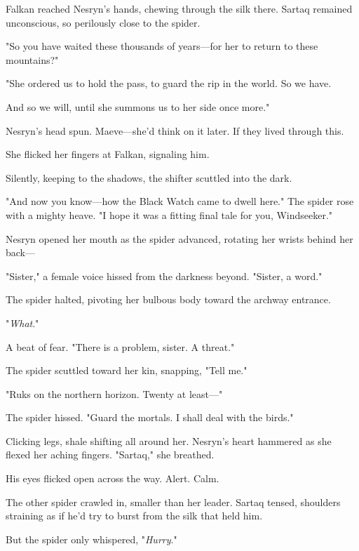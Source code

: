 Falkan reached Nesryn's hands, chewing through the silk there. Sartaq remained unconscious, so perilously close to the spider.

"So you have waited these thousands of years---for her to return to these mountains?"

"She ordered us to hold the pass, to guard the rip in the world. So we have.

And so we will, until she summons us to her side once more."

Nesryn's head spun. Maeve---she'd think on it later. If they lived through this.

She flicked her fingers at Falkan, signaling him.

Silently, keeping to the shadows, the shifter scuttled into the dark.

"And now you know---how the Black Watch came to dwell here." The spider rose with a mighty heave. "I hope it was a fitting final tale for you, Windseeker."

Nesryn opened her mouth as the spider advanced, rotating her wrists behind her back---

"Sister," a female voice hissed from the darkness beyond. "Sister, a word."

The spider halted, pivoting her bulbous body toward the archway entrance.

"\emph{What}."

A beat of fear. "There is a problem, sister. A threat."

The spider scuttled toward her kin, snapping, "Tell me."

"Ruks on the northern horizon. Twenty at least---"

The spider hissed. "Guard the mortals. I shall deal with the birds."

Clicking legs, shale shifting all around her. Nesryn's heart hammered as she flexed her aching fingers. "Sartaq," she breathed.

His eyes flicked open across the way. Alert. Calm.

The other spider crawled in, smaller than her leader. Sartaq tensed, shoulders straining as if he'd try to burst from the silk that held him.

But the spider only whispered, "\emph{Hurry}."

